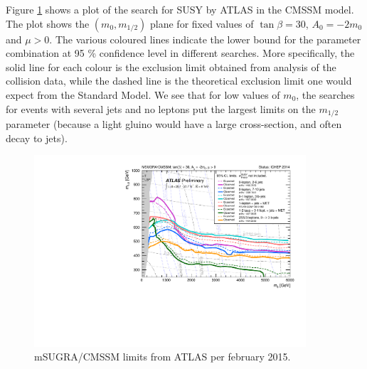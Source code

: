 \documentclass[twoside,english]{uiofysmaster}
\begin{document}
Figure \ref{fig:ATLAS_mSUGRA} shows a plot of the search for SUSY by ATLAS in the CMSSM model. The plot shows the $(m_0,m_{1/2})$ plane for fixed values of $\tan\beta = 30$, $A_0 = -2m_0$ and $\mu>0$. The various coloured lines indicate the lower bound for the parameter combination at 95 \% confidence level in different searches. More specifically, the solid line for each colour is the exclusion limit obtained from analysis of the collision data, while the dashed line is the theoretical exclusion limit one would expect from the Standard Model. We see that for low values of $m_0$, the searches for events with several jets and no leptons put the largest limits on the $m_{1/2}$ parameter (because a light gluino would have a large cross-section, and often decay to jets).
\begin{figure}[hbt]
	\centering
	\includegraphics[width=0.9\textwidth]{figures/susyintro/ATLAS_SUSY_MSUGRA.pdf}
	\caption{mSUGRA/CMSSM limits from ATLAS per february 2015. }
	\label{fig:ATLAS_mSUGRA}
\end{figure}
\end{document}
